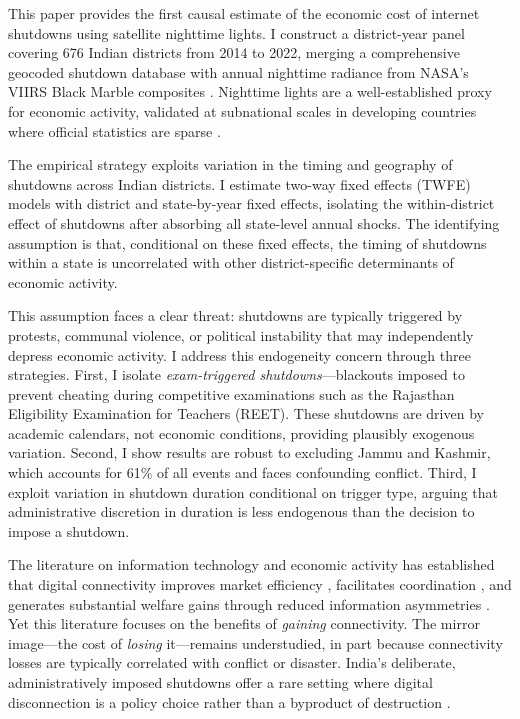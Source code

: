 \documentclass[12pt]{article}
\begin{document}
This paper provides the first causal estimate of the economic cost of internet shutdowns using satellite nighttime lights. I construct a district-year panel covering 676 Indian districts from 2014 to 2022, merging a comprehensive geocoded shutdown database \citep{koning2023shutdowns} with annual nighttime radiance from NASA's VIIRS Black Marble composites \citep{roman2018nasa}. Nighttime lights are a well-established proxy for economic activity, validated at subnational scales in developing countries where official statistics are sparse \citep{henderson2012measuring, chen2011using, mellander2015night}.

The empirical strategy exploits variation in the timing and geography of shutdowns across Indian districts. I estimate two-way fixed effects (TWFE) models with district and state-by-year fixed effects, isolating the within-district effect of shutdowns after absorbing all state-level annual shocks. The identifying assumption is that, conditional on these fixed effects, the timing of shutdowns within a state is uncorrelated with other district-specific determinants of economic activity.

This assumption faces a clear threat: shutdowns are typically triggered by protests, communal violence, or political instability that may independently depress economic activity. I address this endogeneity concern through three strategies. First, I isolate \emph{exam-triggered shutdowns}---blackouts imposed to prevent cheating during competitive examinations such as the Rajasthan Eligibility Examination for Teachers (REET). These shutdowns are driven by academic calendars, not economic conditions, providing plausibly exogenous variation. Second, I show results are robust to excluding Jammu and Kashmir, which accounts for 61\% of all events and faces confounding conflict. Third, I exploit variation in shutdown duration conditional on trigger type, arguing that administrative discretion in duration is less endogenous than the decision to impose a shutdown.

The literature on information technology and economic activity has established that digital connectivity improves market efficiency \citep{jensen2007digital, aker2010information}, facilitates coordination \citep{howard2011opening}, and generates substantial welfare gains through reduced information asymmetries \citep{goldstein2020effects}. Yet this literature focuses on the benefits of \emph{gaining} connectivity. The mirror image---the cost of \emph{losing} it---remains understudied, in part because connectivity losses are typically correlated with conflict or disaster. India's deliberate, administratively imposed shutdowns offer a rare setting where digital disconnection is a policy choice rather than a byproduct of destruction \citep{guriev2021informational}.
\end{document}
